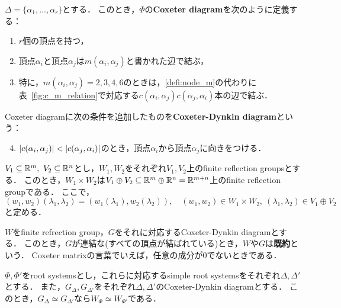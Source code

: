\begin{definition}
  $\Delta = \{\alpha_1, \ldots, \alpha_r\}$とする．
  このとき，$\Phi$の\textbf{Coxeter diagram}を次のように定義する：
  \begin{enumerate}[label=(\roman*)]
    \item $r$個の頂点を持つ，
    \item 頂点$\alpha_i$と頂点$\alpha_j$は$m(\alpha_i, \alpha_j)$と書かれた辺で結ぶ，\label{defi:node_m}
    \item 特に，$m(\alpha_i, \alpha_j) = 2, 3, 4, 6$のときは，\ref{defi:node_m}の代わりに表~\ref{fig:c_m_relation}で対応する$c(\alpha_i, \alpha_j) c(\alpha_j, \alpha_i)$本の辺で結ぶ．
  \end{enumerate}
\end{definition}

\begin{definition}
  Coxeter diagramに次の条件を追加したものを\textbf{Coxeter-Dynkin diagram}という：
  \begin{enumerate}[label=(\roman*)]
    \setcounter{enumi}{3}
    \item $\left| c(\alpha_i, \alpha_j) \right| < \left| c(\alpha_j, \alpha_i) \right|$のとき，頂点$\alpha_i$から頂点$\alpha_j$に向きをつける．
  \end{enumerate}
\end{definition}

\begin{proposition}
  \label{prop:direct_prod_is_FRG}
  $V_1 \subseteq \mathbb{R}^m,\ V_2 \subseteq \mathbb{R}^n$とし，$W_1, W_2$をそれぞれ$V_1, V_2$上のfinite reflection groupsとする．
  このとき，$W_1 \times W_2$は$V_1 \oplus V_2 \subseteq \mathbb{R}^m \oplus \mathbb{R}^n = \mathbb{R}^{m+n}$上のfinite reflection groupである．
  ここで，
  \begin{equation}
    (w_1, w_2)(\lambda_1, \lambda_2) = (w_1(\lambda_1), w_2(\lambda_2)),\quad (w_1, w_2) \in W_1 \times W_2,\ (\lambda_1, \lambda_2) \in V_1 \oplus V_2
  \end{equation}
  と定める．
\end{proposition}

\begin{definition}
  \label{defi:irreducible}
  $W$をfinite refrection group，$G$をそれに対応するCoxeter-Dynkin diagramとする．
  このとき，$G$が連結な(すべての頂点が結ばれている)とき，$W$や$G$は\textbf{既約}という．
  Coxeter matrixの言葉でいえば，任意の成分が$0$でないときである．
\end{definition}

\begin{theorem}
  \label{thm:diag_is_simeq_implies_FRG_is_simeq}
  $\Phi, \Phi'$をroot systemsとし，これらに対応するsimple root systemsをそれぞれ$\Delta, \Delta'$とする．
  また，$G_\Delta, G_{\Delta'}$をそれぞれ$\Delta, \Delta'$のCoxeter-Dynkin diagramとする．
  このとき，$G_\Delta \simeq G_{\Delta'}$なら$W_\Phi \simeq W_{\Phi'}$である．
\end{theorem}

